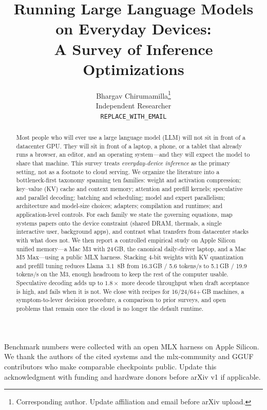 \documentclass{article}
\title{Running Large Language Models on Everyday Devices:\\ A Survey of Inference Optimizations}
\author{%
  Bhargav Chirumamilla\thanks{Corresponding author. Update affiliation and email before arXiv upload.} \\
  Independent Researcher \\
  \texttt{REPLACE\_WITH\_EMAIL} \\
}
\begin{document}
\maketitle

\begin{abstract}
Most people who will ever use a large language model (LLM) will not sit in front of a datacenter GPU. They will sit in front of a laptop, a phone, or a tablet that already runs a browser, an editor, and an operating system---and they will expect the model to share that machine. This survey treats \emph{everyday-device inference} as the primary setting, not as a footnote to cloud serving. We organize the literature into a bottleneck-first taxonomy spanning ten families: weight and activation compression; key--value (KV) cache and context memory; attention and prefill kernels; speculative and parallel decoding; batching and scheduling; model and expert parallelism; architecture and model-size choices; adapters; compilation and runtimes; and application-level controls. For each family we state the governing equations, map systems papers onto the device constraint (shared DRAM, thermals, a single interactive user, background apps), and contrast what transfers from datacenter stacks with what does not. We then report a controlled empirical study on Apple Silicon unified memory---a Mac M3 with 24\,GB, the canonical daily-driver laptop, and a Mac M5 Max---using a public MLX harness. Stacking 4-bit weights with KV quantization and prefill tuning reduces Llama~3.1~8B from 16.3\,GB / 5.6 tokens/s to 5.1\,GB / 19.9 tokens/s on the M3, enough headroom to keep the rest of the computer usable. Speculative decoding adds up to \(1.8\times\) more decode throughput when draft acceptance is high, and fails when it is not. We close with recipes for 16/24/64+\,GB machines, a symptom-to-lever decision procedure, a comparison to prior surveys, and open problems that remain once the cloud is no longer the default runtime.
\end{abstract}












\begin{ack}
Benchmark numbers were collected with an open MLX harness on Apple Silicon. We thank the authors of the cited systems and the mlx-community and GGUF contributors who make comparable checkpoints public. Update this acknowledgment with funding and hardware donors before arXiv v1 if applicable.
\end{ack}




\newpage
\appendix

\end{document}
